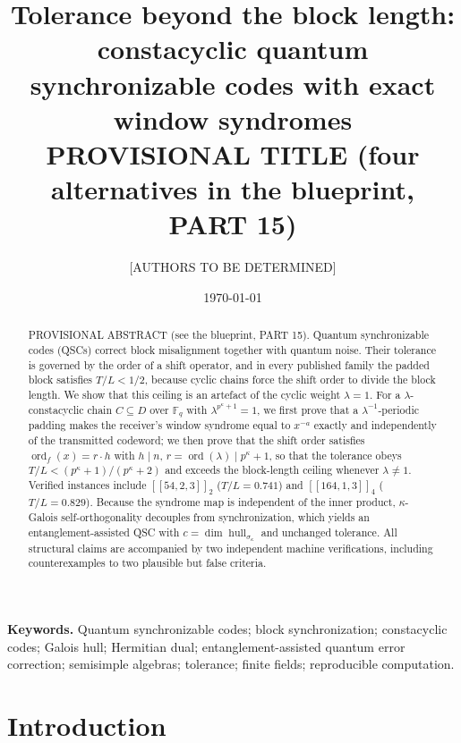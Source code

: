 \documentclass[11pt]{article}
\title{\textbf{Tolerance beyond the block length:\\ constacyclic quantum synchronizable codes with exact window syndromes}\\[4pt]
\large PROVISIONAL TITLE (four alternatives in the blueprint, PART 15)}
\author{[AUTHORS TO BE DETERMINED]}
\date{\today}
\theoremstyle{definition}
\theoremstyle{remark}
\theoremstyle{plain}
\newcommand{\Fq}{\mathbb{F}_q}
\newcommand{\hull}{\operatorname{hull}}
\newcommand{\ord}{\operatorname{ord}}
\newcommand{\Sig}{\sigma_\kappa}
\newcommand{\Tol}{T}
\begin{document}
\maketitle

\begin{abstract}
\noindent
PROVISIONAL ABSTRACT (see the blueprint, PART 15).
Quantum synchronizable codes (QSCs) correct block misalignment together with quantum noise.
Their tolerance is governed by the order of a shift operator, and in every published family the
padded block satisfies $\Tol/L<1/2$, because cyclic chains force the shift order to divide the
block length. We show that this ceiling is an artefact of the cyclic weight $\lambda=1$. For a
$\lambda$-constacyclic chain $C\subseteq D$ over $\Fq$ with $\lambda^{p^\kappa+1}=1$, we first
prove that a $\lambda^{-1}$-periodic padding makes the receiver's window syndrome equal to
$x^{-a}$ exactly and independently of the transmitted codeword; we then prove that the shift
order satisfies $\ord_f(x)=r\cdot h$ with $h\mid n$, $r=\ord(\lambda)\mid p^\kappa+1$, so that
the tolerance obeys $\Tol/L<(p^\kappa+1)/(p^\kappa+2)$ and exceeds the block-length ceiling
whenever $\lambda\ne1$. Verified instances include $[[54,2,3]]_2$ ($\Tol/L=0.741$) and
$[[164,1,3]]_4$ ($\Tol/L=0.829$). Because the syndrome map is independent of the inner product,
$\kappa$-Galois self-orthogonality decouples from synchronization, which yields an
entanglement-assisted QSC with $c=\dim\hull_{\Sig}$ and unchanged tolerance. All structural
claims are accompanied by two independent machine verifications, including counterexamples to
two plausible but false criteria.
\end{abstract}

\noindent\textbf{Keywords.} Quantum synchronizable codes; block synchronization; constacyclic
codes; Galois hull; Hermitian dual; entanglement-assisted quantum error correction; semisimple
algebras; tolerance; finite fields; reproducible computation.

\section{Introduction}\label{sec:intro}
\end{document}
